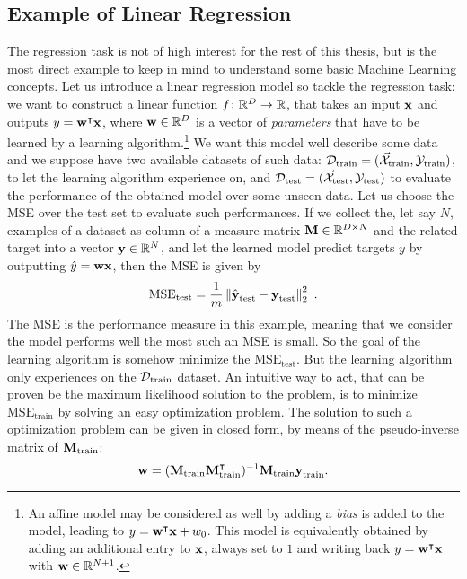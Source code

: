 
\subsection{Example of Linear Regression}
The regression task is not of high interest for the rest of this thesis, but is the most direct example to keep in mind to understand some basic Machine Learning concepts. Let us introduce a linear regression model so tackle the regression task: we want to construct a linear function $f\colon \mathbb{R}^D \rightarrow \mathbb{R}$, that takes an input $\textbf{x}$ and outputs $y = \textbf{w}^\intercal \textbf{x}$, where $\textbf{w}\in \mathbb{R}^D$ is a vector of \emph{parameters} that have to be learned by a learning algorithm.\footnote{An affine model may be considered as well by adding a \emph{bias} is added to the model, leading to $y = \textbf{w}^\intercal \textbf{x}+w_0$. This model is equivalently obtained by adding an additional entry to $\textbf{x}$, always set to $1$ and writing back $y = \textbf{w}^\intercal \textbf{x}$ with $\textbf{w}\in \mathbb{R}^{N+1}$. } We want this model well describe some data and we suppose have two available datasets of such data: $\mathcal{D}_{\text{train}} = (\vec{\mathcal{X}}_{\text{train}}, {\mathcal{Y}}_{\text{train}})$, to let the learning algorithm experience on, and $\mathcal{D}_{\text{test}} = (\vec{\mathcal{X}}_{\text{test}}, {\mathcal{Y}}_{\text{test}})$ to evaluate the performance of the obtained model over some unseen data. Let us choose the MSE over the test set to evaluate such performances. If we collect the, let say $N$, examples of a dataset as column of a measure matrix $\textbf{M}\in \mathbb{R}^{D \times N}$ and the related target into a vector $\textbf{y}\in \mathbb{R}^N$, and let the learned model predict targets $y$ by outputting $\hat{y} = \textbf{w}\textbf{x}$, then the MSE is given by
\begin{equation}
 \mathrm{MSE_{test}} = \frac{1}{m} \left\lVert\hat{\textbf{y}}_{\text{test}}-\textbf{y}_{\text{test}}\right\rVert^2_2 \mbox{ .}
\end{equation}
 The MSE is the performance measure in this example, meaning that we consider the model performs well the most such an MSE is small. So the goal of the learning algorithm is somehow minimize the $\mathrm{MSE_{test}}$. But the learning algorithm only experiences on the $\mathcal{D}_{\text{train}}$ dataset. An intuitive way to act, that can be proven be the maximum likelihood solution to the problem, is to minimize  $\mathrm{MSE_{train}}$ by solving an easy optimization problem. The solution to such a optimization problem can be given in closed form, by means of the pseudo-inverse matrix of $\textbf{M}_{\text{train}}$:
\begin{equation}
\textbf{w} = (\textbf{M}_{\text{train}}\textbf{M}_{\text{train}}^\intercal)^{-1}\textbf{M}_{\text{train}}\textbf{y}_{\text{train}}.
\end{equation}


